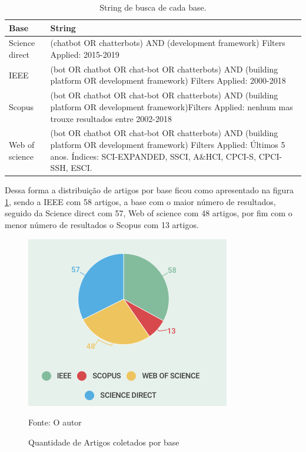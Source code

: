 \begin{table}[H]
    
    \begin{center}
    \begin{tabular}{| p{5cm}| p{10cm}|}
    \hline
     Base & String\\
    \hline
     Science direct & (chatbot OR chatterbots) AND (development framework)
Filters Applied: 2015-2019 \\ 
    \hline
     IEEE & (bot OR chatbot OR chat-bot OR chatterbots) AND (building platform OR development framework)
Filters Applied: 2000-2018\\ 
    \hline
     Scopus & (bot OR chatbot OR chat-bot OR chatterbots) AND (building platform OR development framework)Filters Applied: nenhum mas trouxe resultados entre 2002-2018\\ 
    \hline
     Web of science & (bot OR chatbot OR chat-bot OR chatterbots) AND (building platform OR development framework) Filters Applied: Últimos 5 anos. Índices: SCI-EXPANDED, SSCI, A\&HCI, CPCI-S, CPCI-SSH, ESCI.\\
     \hline
    \end{tabular}
    \caption{ String de busca de cada base.}
    \label{tab:stringBase}
    
    \end{center}
   
\end{table}

Dessa forma a distribuição de artigos por base ficou como apresentado na figura \ref{fig:bases}, sendo
a IEEE com 58 artigos, a base com o maior número de resultados, seguido da
Science direct com 57, Web of science com 48 artigos, por fim com o menor
número de resultados o Scopus com 13 artigos.


\begin{figure}[H]
  \caption{Quantidade de Artigos coletados por base}

  \centering
  \includegraphics[scale=0.8]{Imagens/grafico_bases.png} 

  \label{fig:bases}
  Fonte: O autor
\end{figure}


